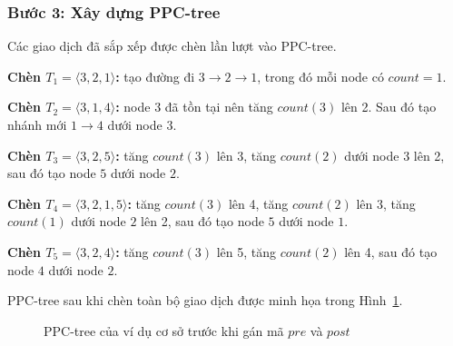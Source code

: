 \subsubsection{Bước 3: Xây dựng PPC-tree}

Các giao dịch đã sắp xếp được chèn lần lượt vào PPC-tree.

\textbf{Chèn $T_1=\langle3,2,1\rangle$:}
tạo đường đi $3\rightarrow2\rightarrow1$, trong đó mỗi node có $count=1$.

\textbf{Chèn $T_2=\langle3,1,4\rangle$:}
node $3$ đã tồn tại nên tăng $count(3)$ lên 2. Sau đó tạo nhánh mới $1\rightarrow4$ dưới node $3$.

\textbf{Chèn $T_3=\langle3,2,5\rangle$:}
tăng $count(3)$ lên 3, tăng $count(2)$ dưới node $3$ lên 2, sau đó tạo node $5$ dưới node $2$.

\textbf{Chèn $T_4=\langle3,2,1,5\rangle$:}
tăng $count(3)$ lên 4, tăng $count(2)$ lên 3, tăng $count(1)$ dưới node $2$ lên 2, sau đó tạo node $5$ dưới node $1$.

\textbf{Chèn $T_5=\langle3,2,4\rangle$:}
tăng $count(3)$ lên 5, tăng $count(2)$ lên 4, sau đó tạo node $4$ dưới node $2$.

PPC-tree sau khi chèn toàn bộ giao dịch được minh họa trong Hình~\ref{fig:basic-ppctree-structure}.

\begin{figure}[H]
\centering
{}
\caption{PPC-tree của ví dụ cơ sở trước khi gán mã $pre$ và $post$}
\label{fig:basic-ppctree-structure}
\end{figure}

